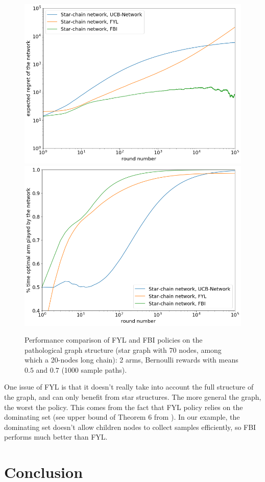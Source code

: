 \documentclass{article}
\begin{document}
\begin{figure}[H]
  \centering
  \includegraphics[width=0.49\linewidth]{fig5_1.png}
  \includegraphics[width=0.49\linewidth]{fig5_2.png}
  \caption{Performance comparison of FYL and FBI policies on the pathological graph structure (star graph with 70 nodes, among which a 20-nodes long chain): 2 arms, Bernoulli rewards with means $0.5$ and $0.7$ (1000 sample paths).}
\end{figure}

One issue of FYL is that it doesn't really take into account the full structure of the graph, and can only benefit from star structures. The more general the graph, the worst the policy. This comes from the fact that FYL policy relies on the dominating set (see upper bound of Theorem 6 from \cite{DBLP:journals/corr/KollaJG16}). In our example, the dominating set doesn't allow children nodes to collect samples efficiently, so FBI performs much better than FYL.

\section{Conclusion}


{\small


}
\end{document}

